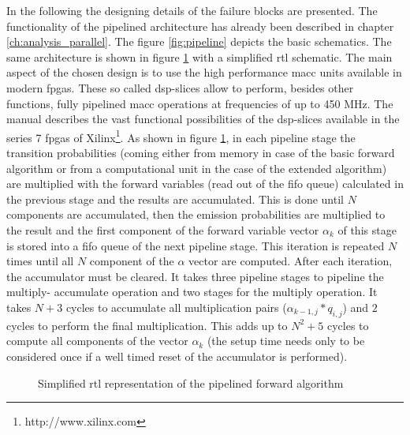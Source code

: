 \documentclass[mscthesis]{usiinfthesis}
\begin{document}
In the following the designing details of the failure blocks are presented.
The functionality of the pipelined architecture has already been described in
chapter \ref{ch:analysis_parallel}. The figure \ref{fig:pipeline} depicts the
basic schematics. The same architecture is shown in figure \ref{fig:arch_pipe}
with a simplified \gls{rtl} schematic. The main aspect of the chosen design is
to use the high performance \gls{macc} units available in modern \glspl{fpga}.
These so called \gls{dsp}-slices allow to perform, besides other functions,
fully pipelined \gls{macc} operations at frequencies of up to 450 MHz. The
manual \cite{xilinx_DSP} describes the vast functional possibilities of the
\gls{dsp}-slices available in the series 7 \glspl{fpga} of
Xilinx\footnote{http://www.xilinx.com}. As shown in figure \ref{fig:arch_pipe},
in each pipeline stage the transition probabilities (coming either from memory
in case of the basic forward algorithm or from a computational unit in the case
of the extended algorithm) are multiplied with the forward variables (read out
of the fifo queue) calculated in the previous stage and the results are
accumulated. This is done until $N$ components are accumulated, then the
emission probabilities are multiplied to the result and the first component of
the forward variable vector $\alpha_k$ of this stage is stored into a fifo
queue of the next pipeline stage. This iteration is repeated $N$ times until
all $N$ component of the $\alpha$ vector are computed. After each iteration,
the accumulator must be cleared. It takes three pipeline stages to pipeline the
multiply- accumulate operation and two stages for the multiply operation. It
takes $N+3$ cycles to accumulate all multiplication pairs ($\alpha_{k-1, j}
* q_{i,j}$) and $2$ cycles to perform the final multiplication. This adds up to
$N^2+5$ cycles to compute all components of the vector $\alpha_k$ (the setup
time needs only to be considered once if a well timed reset of the accumulator
is performed).

\begin{figure}
    \centering
    
    \caption{Simplified \acrshort{rtl} representation of the pipelined forward algorithm}
    \label{fig:arch_pipe}
\end{figure}
\end{document}
